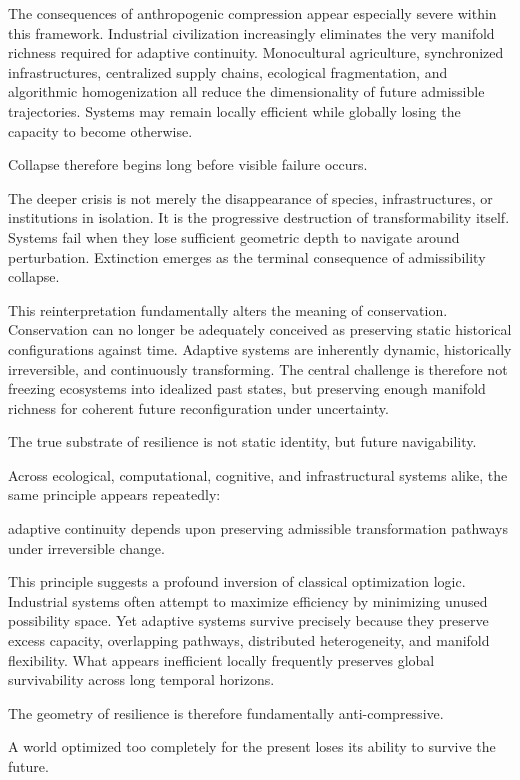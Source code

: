 \documentclass[11pt,a4paper]{article}
\begin{document}
The consequences of anthropogenic compression appear especially severe within this framework. Industrial civilization increasingly eliminates the very manifold richness required for adaptive continuity. Monocultural agriculture, synchronized infrastructures, centralized supply chains, ecological fragmentation, and algorithmic homogenization all reduce the dimensionality of future admissible trajectories. Systems may remain locally efficient while globally losing the capacity to become otherwise.

Collapse therefore begins long before visible failure occurs.

The deeper crisis is not merely the disappearance of species, infrastructures, or institutions in isolation. It is the progressive destruction of transformability itself. Systems fail when they lose sufficient geometric depth to navigate around perturbation. Extinction emerges as the terminal consequence of admissibility collapse.

This reinterpretation fundamentally alters the meaning of conservation. Conservation can no longer be adequately conceived as preserving static historical configurations against time. Adaptive systems are inherently dynamic, historically irreversible, and continuously transforming. The central challenge is therefore not freezing ecosystems into idealized past states, but preserving enough manifold richness for coherent future reconfiguration under uncertainty.

The true substrate of resilience is not static identity, but future navigability.

Across ecological, computational, cognitive, and infrastructural systems alike, the same principle appears repeatedly:

adaptive continuity depends upon preserving admissible transformation pathways under irreversible change.

This principle suggests a profound inversion of classical optimization logic. Industrial systems often attempt to maximize efficiency by minimizing unused possibility space. Yet adaptive systems survive precisely because they preserve excess capacity, overlapping pathways, distributed heterogeneity, and manifold flexibility. What appears inefficient locally frequently preserves global survivability across long temporal horizons.

The geometry of resilience is therefore fundamentally anti-compressive.

A world optimized too completely for the present loses its ability to survive the future.
\end{document}
